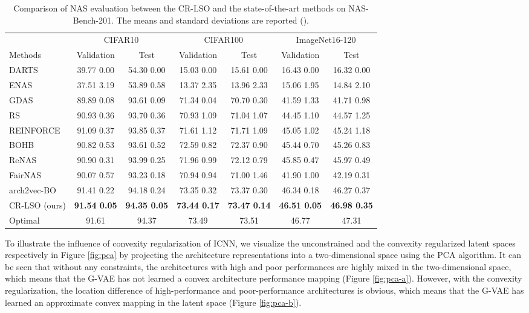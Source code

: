 \documentclass[10pt,twocolumn,letterpaper]{article}
\begin{document}
\begin{table*}[htbp]
	\centering
	\caption{Comparison of NAS evaluation between the CR-LSO and the state-of-the-art methods on NAS-Bench-201. The means and standard deviations are reported (). }
	\begin{tabular}{lcccccc}
		\toprule
		{} & \multicolumn{2}{c}{CIFAR10} & \multicolumn{2}{c}{CIFAR100} & \multicolumn{2}{c}{ImageNet16-120}   \\
		\cline{2-7} \specialrule{0em}{1.5pt}{2.0pt}
		Methods & Validation & Test & Validation & Test & Validation & Test  \\
		\midrule
		DARTS \cite{liu2018darts} & 39.77  0.00 & 54.30  0.00 & 15.03  0.00 & 15.61  0.00 & 16.43  0.00 & 16.32  0.00 \\
		ENAS \cite{DBLP:conf/icml/PhamGZLD18} & 37.51  3.19 & 53.89  0.58 & 13.37  2.35 & 13.96  2.33 & 15.06  1.95 & 14.84  2.10 \\
		GDAS \cite{DBLP:conf/cvpr/DongY19} & 89.89  0.08 & 93.61  0.09 & 71.34  0.04 & 70.70  0.30 & 41.59  1.33 &  41.71  0.98 \\
		RS \cite{bergstra2012random} & 90.93  0.36 & 93.70  0.36 & 70.93  1.09 & 71.04  1.07 & 44.45  1.10 & 44.57  1.25 \\
		REINFORCE \cite{williams1992simple} & 91.09  0.37 & 93.85  0.37 & 71.61  1.12 & 71.71  1.09 & 45.05  1.02 & 45.24  1.18 \\
		\midrule
		BOHB \cite{DBLP:conf/icml/FalknerKH18} & 90.82  0.53 & 93.61  0.52 & 72.59  0.82 & 72.37  0.90 & 45.44  0.70 & 45.26  0.83 \\
		ReNAS \cite{DBLP:conf/cvpr/Xu00TJX021} & 90.90  0.31 & 93.99  0.25 & 71.96  0.99 & 72.12  0.79 & 45.85  0.47 & 45.97  0.49 \\
		FairNAS \cite{DBLP:conf/iccv/Chu0X21} & 90.07  0.57 & 93.23  0.18 & 70.94  0.94 & 71.00  1.46 & 41.90  1.00 & 42.19  0.31 \\
		arch2vec-BO \cite{DBLP:conf/nips/YanZAZ020} & 91.41  0.22 & 94.18  0.24 & 73.35  0.32 & 73.37  0.30 & 46.34  0.18 & 46.27  0.37 \\
		CR-LSO (ours) & \textbf{91.54  0.05} & \textbf{94.35  0.05} & \textbf{73.44  0.17} & \textbf{73.47  0.14} & \textbf{46.51  0.05} & \textbf{46.98  0.35} \\
		\midrule
		Optimal & 91.61 & 94.37 & 73.49 & 73.51 & 46.77 & 47.31 \\
		\bottomrule
	\end{tabular}
	\label{tab:nas_bench_201}
\end{table*}
To illustrate the influence of convexity regularization of ICNN, we visualize the unconstrained and the convexity regularized latent spaces respectively in Figure \ref{fig:pca} by projecting the architecture representations into a two-dimensional space using the PCA algorithm. It can be seen that without any constraints, the architectures with high and poor performances are highly mixed in the two-dimensional space, which means that the G-VAE has not learned a convex architecture performance mapping (Figure \ref{fig:pca-a}). However, with the convexity regularization, the location difference of high-performance and poor-performance architectures is obvious, which means that the G-VAE has learned an approximate convex mapping in the latent space (Figure \ref{fig:pca-b}). 
\end{document}
